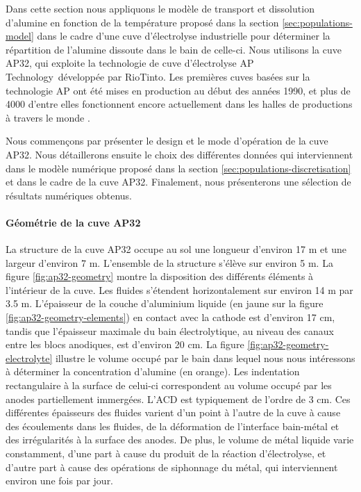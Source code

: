 Dans cette section nous appliquons le modèle de transport et
dissolution d'alumine en fonction de la température proposé dans la
section \ref{sec:populations-model} dans le cadre d'une cuve
d'électrolyse industrielle pour déterminer la répartition de l'alumine
dissoute dans le bain de celle-ci. Nous utilisons la cuve AP32, qui
exploite la technologie de cuve d'électrolyse AP
Technology\texttrademark\ développée par RioTinto. Les premières cuves
basées sur la technologie AP ont été mises en production au début des
années 1990, et plus de \num{4000} d'entre elles fonctionnent encore
actuellement dans les halles de productions à travers le monde
\cite{RiotintoAP30}.

Nous commençons par présenter le design et le mode d'opération de la
cuve AP32. Nous détaillerons ensuite le choix des différentes données
qui interviennent dans le modèle numérique proposé dans la section
\ref{sec:populations-discretisation} et dans le cadre de la cuve
AP32. Finalement, nous présenterons une sélection de résultats
numériques obtenus.

\paragraph{Géométrie de la cuve AP32} La structure de la cuve AP32
occupe au sol une longueur d'environ \num{17} \si{\meter} et une
largeur d'environ \num{7} \si{\meter}. L'ensemble de la structure
s'élève sur environ \num{5} \si{\meter}. La figure
\ref{fig:ap32-geometry} montre la disposition des différents éléments
à l'intérieur de la cuve. Les fluides s'étendent horizontalement sur
environ \num{14} \si{\meter} par \num{3.5} \si{\meter}. L'épaisseur de
la couche d'aluminium liquide (en jaune sur la figure
\ref{fig:ap32-geometry-elements}) en contact avec la cathode est
d'environ \num{17} \si{\centi\meter}, tandis que l'épaisseur maximale
du bain électrolytique, au niveau des canaux entre les blocs
anodiques, est d'environ \num{20} \si{\centi\meter}. La figure
\ref{fig:ap32-geometry-electrolyte} illustre le volume occupé par le
bain dans lequel nous nous intéressons à déterminer la concentration
d'alumine (en orange). Les indentation rectangulaire à la surface de
celui-ci correspondent au volume occupé par les anodes partiellement
immergées. L'ACD est typiquement de l'ordre de \num{3}
\si{\centi\meter}. Ces différentes épaisseurs des fluides varient d'un
point à l'autre de la cuve à cause des écoulements dans les fluides,
de la déformation de l'interface bain-métal et des irrégularités à la
surface des anodes. De plus, le volume de métal liquide varie
constamment, d'une part à cause du produit de la réaction
d'électrolyse, et d'autre part à cause des opérations de siphonnage du
métal, qui interviennent environ une fois par jour.

